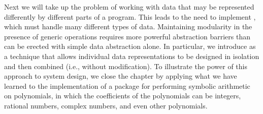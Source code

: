 Next we will take up the problem of working with data that may be represented
differently by different parts of a program.  This leads to the need to
implement , which must handle many different types
of data.  Maintaining modularity in the presence of generic operations requires
more powerful abstraction barriers than can be erected with simple data
abstraction alone.  In particular, we introduce  as a technique that allows individual data representations to be
designed in isolation and then combined  (i.e., without
modification).  To illustrate the power of this approach to system design, we
close the chapter by applying what we have learned to the implementation of a
package for performing symbolic arithmetic on polynomials, in which the
coefficients of the polynomials can be integers, rational numbers, complex
numbers, and even other polynomials.



